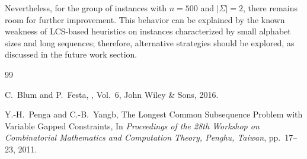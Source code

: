 \documentclass[runningheads]{llncs}
\begin{document}
Nevertheless, for the group of instances with $n=500$ and $|\Sigma|=2$, there remains room for further improvement. This behavior can be explained by the known weakness of LCS-based heuristics on instances characterized by small alphabet sizes and long sequences; therefore, alternative strategies should be explored, as discussed in the future work section.

 \begin{thebibliography}{99}
 	
 	C.~Blum and P.~Festa,
 	,
 	\newblock Vol.~6, John Wiley \& Sons, 2016.
 	
 	Y.-H.~Penga and C.-B.~Yangb,
 	\newblock The Longest Common Subsequence Problem with Variable Gapped Constraints,
 	\newblock In {\em Proceedings of the 28th Workshop on Combinatorial Mathematics and Computation Theory, Penghu, Taiwan}, pp.~17--23, 2011.
 	
 \end{thebibliography}
\end{document}
